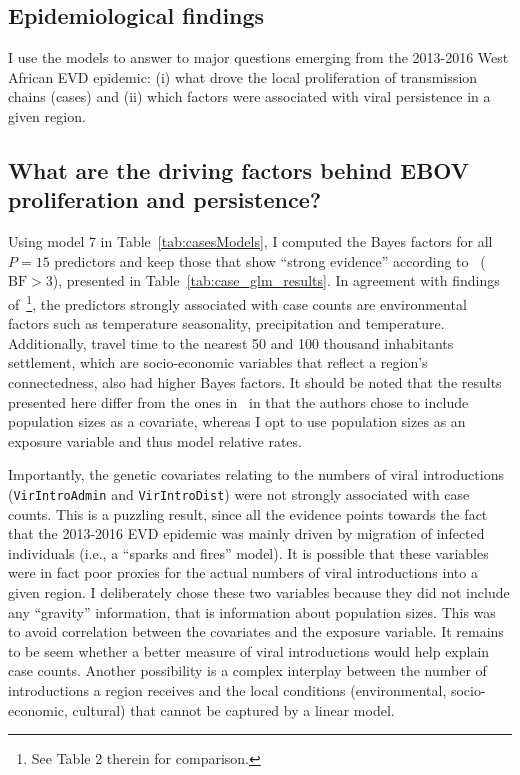 \subsection*{Epidemiological findings}

I use the models to answer to major questions emerging from the 2013-2016 West African EVD epidemic: (i) what drove the local proliferation of transmission chains (cases) and (ii) which factors were associated with viral persistence in a given region.

\subsection*{What are the driving factors behind EBOV proliferation and persistence?}

Using model 7 in Table~\ref{tab:casesModels}, I computed the Bayes factors for all $P = 15$ predictors and keep those that show ``strong evidence'' according to~\cite{Kass1995} ($\text{BF}>3$), presented in Table~\ref{tab:case_glm_results}.
In agreement with findings of~\cite{Dudas2017}\footnote{See Table 2 therein for comparison.}, the predictors strongly associated with case counts are environmental factors such as temperature seasonality, precipitation and temperature.
Additionally, travel time to the nearest 50 and 100 thousand inhabitants settlement, which are socio-economic variables that reflect a region's connectedness, also had higher Bayes factors.
It should be noted that the results presented here differ from the ones in~\cite{Dudas2017} in that the authors chose to include population sizes as a covariate, whereas I opt to use population sizes as an exposure variable and thus model relative rates.

Importantly, the genetic covariates relating to the numbers of viral introductions (\verb|VirIntroAdmin| and \verb|VirIntroDist|) were not strongly associated with case counts.
This is a puzzling result, since all the evidence points towards the fact that the 2013-2016 EVD epidemic was mainly driven by migration of infected individuals (i.e., a ``sparks and fires'' model).
It is possible that these variables were in fact poor proxies for the actual numbers of viral introductions into a given region.
I deliberately chose these two variables because they did not include any ``gravity'' information, that is information about population sizes.
This was to avoid correlation between the covariates and the exposure variable.
It remains to be seem whether a better measure of viral introductions would help explain case counts.
Another possibility is a complex interplay between the number of introductions a region receives and the local conditions (environmental, socio-economic, cultural) that cannot be captured by a linear model.

